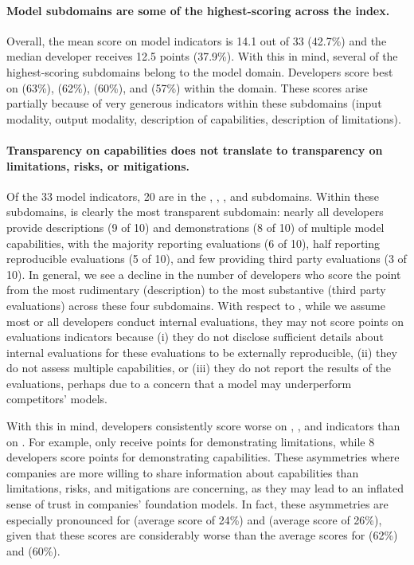\documentclass[screen, authorversion, acmsmall]{acmart}
\begin{document}
\paragraph{Model subdomains are some of the highest-scoring across the index.}
Overall, the mean score on model indicators is 14.1 out of 33 (42.7\%) and the median developer receives 12.5 points (37.9\%). 
With this in mind, several of the highest-scoring subdomains belong to the model domain.
Developers score best on \modelbasics (63\%), \capabilities (62\%), \limitations (60\%), and \modelaccess (57\%) within the domain.
These scores arise partially because of very generous indicators within these subdomains (\eg input modality, output modality, description of capabilities, description of limitations).

\paragraph{Transparency on capabilities does not translate to transparency on limitations, risks, or mitigations.}
Of the 33 model indicators, 20 are in the \capabilities, \limitations, \risks, and \modelmitigations subdomains.
Within these subdomains, \capabilities is clearly the most transparent subdomain: nearly all developers provide descriptions (9 of 10) and demonstrations (8 of 10) of multiple model capabilities, with the majority reporting evaluations (6 of 10), half reporting reproducible evaluations (5 of 10), and few providing third party evaluations (3 of 10).
In general, we see a decline in the number of developers who score the point from the most rudimentary (\ie description) to the most substantive (\ie third party evaluations) across these four subdomains.
With respect to \capabilities, while we assume most or all developers conduct internal evaluations, they may not score points on evaluations indicators because (i) they do not disclose sufficient details about internal evaluations for these evaluations to be externally reproducible, (ii) they do not assess multiple capabilities, or (iii) they do not report the results of the evaluations, perhaps due to a concern that a model may underperform competitors' models. 

With this in mind, developers consistently score worse on \limitations, \risks, and \modelmitigations indicators than on \capabilities.
For example, only \cohere receive points for demonstrating limitations, while 8 developers score points for demonstrating capabilities. 
These asymmetries where companies are more willing to share information about capabilities than limitations, risks, and mitigations are concerning, as they may lead to an inflated sense of trust in companies' foundation models. 
In fact, these asymmetries are especially pronounced for \risks (average score of 24\%) and \modelmitigations (average score of 26\%), given that these scores are considerably worse than the average scores for \capabilities (62\%) and \limitations (60\%). 
\end{document}
